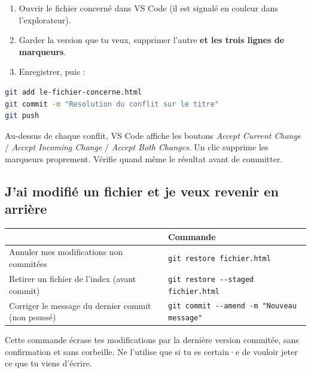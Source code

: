 \documentclass[a4paper,11pt]{article}
\newcommand{\hdr}[1]{\multicolumn{1}{l}{\color{white}\bfseries #1}}
\renewcommand{\arraystretch}{1.3}
\begin{document}
\begin{enumerate}
  \item Ouvrir le fichier concerné dans VS Code (il est signalé en couleur dans l'explorateur).
  \item Garder la version que tu veux, supprimer l'autre \textbf{et les trois lignes de marqueurs}.
  \item Enregistrer, puis :
\end{enumerate}

\begin{lstlisting}[language=bash]
git add le-fichier-concerne.html
git commit -m "Resolution du conflit sur le titre"
git push
\end{lstlisting}

\begin{tcolorbox}[astuce, title={VS Code fait le travail à ta place}]
Au-dessus de chaque conflit, VS Code affiche les boutons \textit{Accept Current Change} / \textit{Accept Incoming Change} / \textit{Accept Both Changes}. Un clic supprime les marqueurs proprement. Vérifie quand même le résultat avant de committer.
\end{tcolorbox}

\subsection{J'ai modifié un fichier et je veux revenir en arrière}

\begin{center}
\renewcommand{\arraystretch}{1.1}
\begin{tabularx}{\linewidth}{p{6.1cm}X}
  \toprule
  \rowcolor{uniNavy}
  \hdr{Situation} & \hdr{Commande} \\
  \midrule
  \rowcolor{uniPaper}
  Annuler mes modifications non commitées & \texttt{git restore fichier.html} \\
  Retirer un fichier de l'index (avant commit) & \texttt{git restore -{}-staged fichier.html} \\
  \rowcolor{uniPaper}
  Corriger le message du dernier commit (non poussé) & \texttt{git commit -{}-amend -m "Nouveau message"} \\
  \bottomrule
\end{tabularx}
\end{center}

\begin{tcolorbox}[interdit, title={\texttt{git restore} détruit du travail}]
Cette commande écrase tes modifications par la dernière version commitée, sans confirmation et sans corbeille. Ne l'utilise que si tu es certain·e de vouloir jeter ce que tu viens d'écrire.
\end{tcolorbox}
\end{document}
